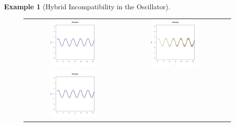 \documentclass{article}
\newcommand{\1}{\mathbbm{1}}
\newtheorem{example}{Example}
\begin{document}
\begin{example}[Hybrid Incompatibility in the Oscillator]
\begin{figure}[H]
  \centering
  \begin{tabular}{ccc}
    \includegraphics[width=0.5\textwidth, height=0.125\paperheight]{examples/osc_F1_hundreth_tau0} &
      \includegraphics[width=0.5\textwidth, height=0.125\paperheight]{examples/osc_F2_hundrethtau0} \\
      \includegraphics[width=0.5\textwidth, height=0.125\paperheight]{examples/osc_F1_tenth_tau0.pdf} &

\end{tabular}
\end{figure}
\end{example}
\end{document}
